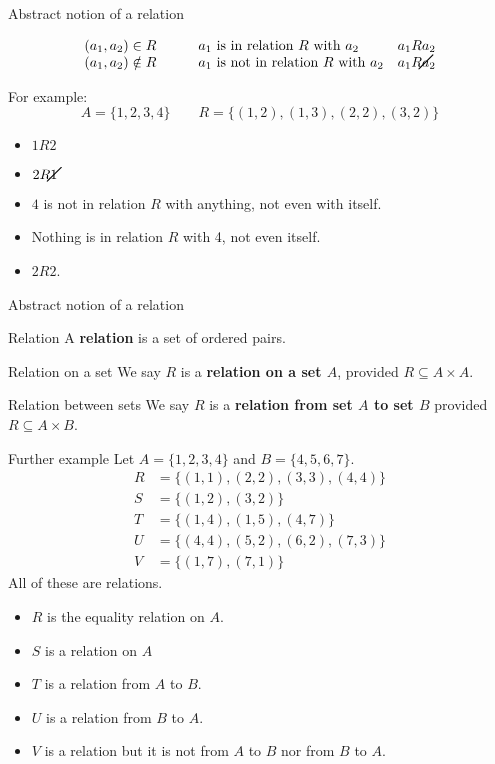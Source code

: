 \documentclass{beamer}
\def\bl[#1]#2{\begin{block}{#1}#2\end{block}}
\def\itemb{\begin{itemize}}
\def\iteme{\end{itemize}}
\begin{document}
\begin{frame}{Abstract notion of a relation}
\bl[]{\vspace{-0.4cm}
\[
\begin{array}{clr}
(a_1,a_2)\in R &\qquad \textrm{$a_1$  is in relation $R$ with $a_2$}& a_1 R a_2\\
(a_1,a_2)\notin R &\qquad\textrm{$a_1$ is not in relation $R$ with $a_2$}& a_1\cancel{R} a_2
\end{array}
\]}
For example:
\[
A=\{1,2,3,4\}\qquad R=\{(1,2), (1,3), (2,2), (3,2)\}
\]
\vspace{-0.5cm}
\itemb
\item $1 R 2$
\item $2 \cancel{R} 1$
\item $4$ is not in relation $R$ with anything, not even with itself.
\item Nothing is in relation $R$ with 4, not even itself.
\item $2 R 2$.
\iteme
\end{frame}

\begin{frame}{Abstract notion of a relation}
\bl[Relation]{
A \textbf{relation} is a set of ordered pairs.
}
\bl[Relation on a set]{
We say $R$ is a \textbf{relation on a set $A$}, provided $R\subseteq A\times A$.
}

\bl[Relation between sets]{
We say $R$ is a \textbf{relation from set $A$ to set $B$} provided $R\subseteq A\times B$.}
\end{frame}

\begin{frame}{Further example}
Let $A=\{1,2,3,4\}$ and $B=\{4,5,6,7\}$.
\begin{align*}
R&=\{(1,1), (2,2), (3,3), (4,4)\}\\
S&=\{(1,2),(3,2)\}\\
T&=\{(1,4),(1,5),(4,7)\}\\
U&=\{(4,4),(5,2),(6,2),(7,3)\}\\
V&=\{(1,7),(7,1)\}
\end{align*}
All of these are relations.
\itemb
\item $R$ is the equality relation on $A$.
\item $S$ is a relation on $A$
\item $T$ is a relation from $A$ to $B$.
\item $U$ is a relation from $B$ to $A$.
\item $V$ is a relation but it is not from $A$ to $B$ nor from $B$ to $A$.
\iteme
\end{frame}
\end{document}
